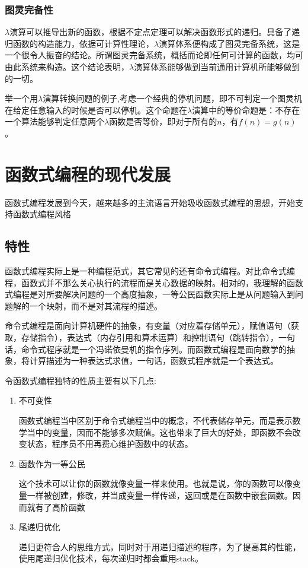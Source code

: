 \documentclass{article}
\begin{document}
		\subsubsection{图灵完备性}
		$\lambda$演算可以推导出新的函数，根据不定点定理可以解决函数形式的递归。具备了递归函数的构造能力，依据可计算性理论，$\lambda$演算体系便构成了图灵完备系统，这是一个很令人振奋的结论。所谓图灵完备系统，概括而论即任何可计算的函数，均可由此系统来构造。这个结论表明，$\lambda$演算体系能够做到当前通用计算机所能够做到的一切。
		
		举一个用$\lambda$演算转换问题的例子,考虑一个经典的停机问题，即不可判定一个图灵机在给定任意输入的时候是否可以停机。这个命题在$\lambda$演算中的等价命题是：不存在一个算法能够判定任意两个$\lambda$函数是否等价，即对于所有的$n$，有$f(n)=g(n)$。

	\section{函数式编程的现代发展}
	函数式编程发展到今天，越来越多的主流语言开始吸收函数式编程的思想，开始支持函数式编程风格
	\subsection{特性}
		函数式编程实际上是一种编程范式，其它常见的还有命令式编程。对比命令式编程，函数式并不那么关心执行的流程而是关心数据的映射。相对的，我理解的函数式编程是对所要解决问题的一个高度抽象，一等公民函数实际上是从问题输入到问题解的一个映射，而不是对其流程的描述。
		
		命令式编程是面向计算机硬件的抽象，有变量（对应着存储单元），赋值语句（获取，存储指令），表达式（内存引用和算术运算）和控制语句（跳转指令），一句话，命令式程序就是一个冯诺依曼机的指令序列。而函数式编程是面向数学的抽象，将计算描述为一种表达式求值，一句话，函数式程序就是一个表达式。
		
		令函数式编程独特的性质主要有以下几点:
		
		\begin{enumerate}
			\item 不可变性
			
			函数式编程当中区别于命令式编程当中的概念，不代表储存单元，而是表示数学当中的变量，因而不能够多次赋值。这也带来了巨大的好处，即函数不会改变状态，程序员不用再费心维护函数中的状态。
			
			\item 函数作为一等公民
			
			这个技术可以让你的函数就像变量一样来使用。也就是说，你的函数可以像变量一样被创建，修改，并当成变量一样传递，返回或是在函数中嵌套函数。因而就有了高阶函数
			
			\item 尾递归优化
			
			递归更符合人的思维方式，同时对于用递归描述的程序，为了提高其的性能，使用尾递归优化技术，每次递归时都会重用stack。
		\end{enumerate}
	
\end{document}
